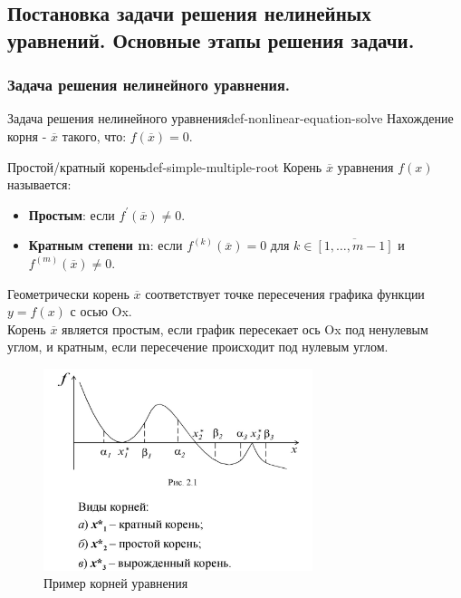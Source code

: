 \documentclass[14pt]{extarticle}
\begin{document}
\subsection{Постановка задачи решения нелинейных уравнений. Основные этапы решения задачи.}

    \subsubsection{Задача решения нелинейного уравнения.}

        \begin{definition}{Задача решения нелинейного уравнения}{def-nonlinear-equation-solve}
            Нахождение корня - $\overline{x}$ такого, что: $f(\overline{x}) = 0$.
        \end{definition}

        \begin{definition}{Простой/кратный корень}{def-simple-multiple-root}
            Корень $\overline{x}$ уравнения $f(x)$ называется:
            \begin{itemize}
                \item \textbf{Простым}: если $f^{'}(\overline{x}) \neq 0$.
                \item \textbf{Кратным степени m}: если $f^{(k)}(\overline{x}) = 0$ для $k \in \overline{[1, \ldots, m-1]}$ и $f^{(m)}(\overline{x}) \neq 0$.
            \end{itemize}
        \end{definition}

        Геометрически корень $\overline{x}$ соответствует точке пересечения графика функции $y = f(x)$ с осью Ox.\\ 
        Корень $\overline{x}$ является простым, если график пересекает ось Ox под ненулевым углом, и кратным, если пересечение происходит под нулевым углом.

        \begin{figure}[H]
            \centering
            \includegraphics[width=0.7\textwidth]{images/roots-ex.png}
            \caption{Пример корней уравнения}
            \label{fig:roots-example}
        \end{figure}
\end{document}
